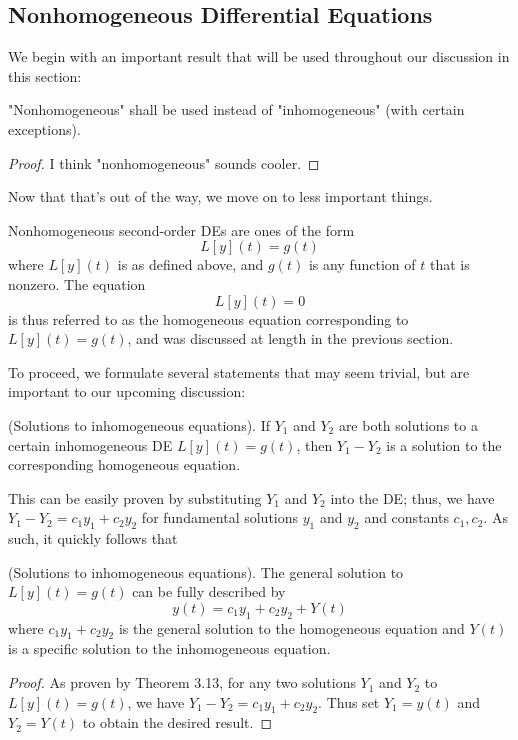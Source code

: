 \documentclass{article}
\begin{document}
\subsection{Nonhomogeneous Differential Equations}
We begin with an important result that will be used throughout our discussion in this section:
\begin{theorem}
    "Nonhomogeneous" shall be used instead of "inhomogeneous" (with certain exceptions).
\end{theorem}
\begin{proof}
    I think "nonhomogeneous" sounds cooler.
\end{proof}
Now that that's out of the way, we move on to less important things. 
\begin{definition}
Nonhomogeneous second-order DEs are ones of the form 
\begin{equation*}
    L[y](t) = g(t)
\end{equation*}
where $L[y](t)$ is as defined above, and $g(t)$ is any function of $t$ that is nonzero. The equation
\begin{equation*}
    L[y](t) = 0
\end{equation*}
is thus referred to as the homogeneous equation corresponding to $L[y](t) = g(t)$, and was discussed at length in the previous section. 
\end{definition}
To proceed, we formulate several statements that may seem trivial, but are important to our upcoming discussion:
\begin{theorem}
    (Solutions to inhomogeneous equations). If $Y_1$ and $Y_2$ are both solutions to a certain inhomogeneous DE $L[y](t) = g(t)$, then $Y_1-Y_2$ is a solution to the corresponding homogeneous equation. 
\end{theorem}
This can be easily proven by substituting $Y_1$ and $Y_2$ into the DE; thus, we have $Y_1 - Y_2 = c_1 y_1 + c_2 y_2$ for fundamental solutions $y_1$ and $y_2$ and constants $c_1, c_2$. As such, it quickly follows that 
\begin{theorem}
    (Solutions to inhomogeneous equations). The general solution to $L[y](t) = g(t)$ can be fully described by
    \begin{equation*}
        y(t) = c_1y_1 + c_2 y_2 + Y(t)
    \end{equation*}
    where $c_1 y_1 + c_2 y_2$ is the general solution to the homogeneous equation and $Y(t)$ is a specific solution to the inhomogeneous equation.
\end{theorem}
\begin{proof}
    As proven by Theorem 3.13, for any two solutions $Y_1$ and $Y_2$ to $L[y](t) = g(t)$, we have $Y_1 - Y_2 = c_1y_1 + c_2y_2$. Thus set $Y_1 = y(t)$ and $Y_2 = Y(t)$ to obtain the desired result.
\end{proof}
\end{document}

